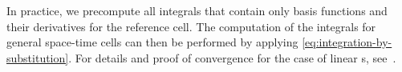 In practice, we precompute all integrals that contain only basis functions and their derivatives for the reference cell.
The computation of the integrals for general space-time cells can then be performed by applying \cref{eq:integration-by-substitution}.
For details and proof of convergence for the case of linear \pde{}s, see~\cite{dumbser2008unified}.

